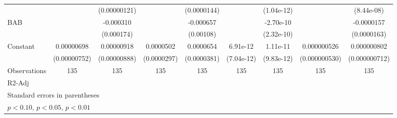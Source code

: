 \begin{table}[htbp]
\begin{tabular}{l*{8}{c}}
                    &                     &(0.00000121)         &                     & (0.0000144)         &                     &  (1.04e-12)         &                     &  (8.44e-08)         \\
[1em]
BAB                 &                     &   -0.000310\sym{*}  &                     &   -0.000657         &                     &   -2.70e-10         &                     &  -0.0000157         \\
                    &                     &  (0.000174)         &                     &   (0.00108)         &                     &  (2.32e-10)         &                     & (0.0000163)         \\
[1em]
Constant            &  0.00000698         &  0.00000918         &   0.0000502\sym{*}  &   0.0000654\sym{*}  &    6.91e-12         &    1.11e-11         & 0.000000526         & 0.000000802         \\
                    &(0.00000752)         &(0.00000888)         & (0.0000297)         & (0.0000381)         &  (7.04e-12)         &  (9.83e-12)         &(0.000000530)         &(0.000000712)         \\
\hline
Observations        &         135         &         135         &         135         &         135         &         135         &         135         &         135         &         135         \\
R2-Adj              &                     &                     &                     &                     &                     &                     &                     &                     \\
\hline\hline
\multicolumn{9}{l}{\footnotesize Standard errors in parentheses}\\
\multicolumn{9}{l}{\footnotesize \sym{*} \(p<0.10\), \sym{**} \(p<0.05\), \sym{***} \(p<0.01\)}\\
\end{tabular}
\end{table}
